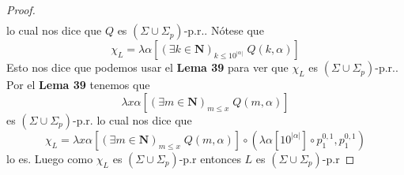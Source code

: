 \begin{lemma}
\begin{proof}
\[\begin{array}{lll}
      \end{array}
    \]
    lo cual nos dice que $Q$ es $(\Sigma \cup \Sigma _{p})$-p.r..
    Nótese que
    \[
      \displaystyle \chi_{L}=\lambda \alpha \left[ (\exists k\in \mathbf{N})_{k\leq 10^{\left\vert \alpha
      \right\vert }}\;Q(k,\alpha )\right]
    \]
    Esto nos dice que podemos usar el \textbf{Lema 39} para ver que $\chi_L$ es $(\Sigma \cup \Sigma _{p})$-p.r..
    Por el \textbf{Lema 39} tenemos que
    \[
      \displaystyle \lambda x\alpha \left[ (\exists m\in \mathbf{N})_{m\leq x}\;Q(m,\alpha ) \right]
    \]
    es $(\Sigma \cup \Sigma _{p})$-p.r. lo cual nos dice que
    \[
      \displaystyle \chi_L=\lambda x\alpha \left[ (\exists m\in \mathbf{N})_{m\leq x}\;Q(m,\alpha ) \right] \circ
      (\lambda \alpha \left[ 10^{\left\vert \alpha \right\vert } \right] \circ p_{1}^{0,1},p_{1}^{0,1})
    \]
    lo es. Luego como $ \chi_L $ es $(\Sigma \cup \Sigma _{p})$-p.r entonces $L$ es $(\Sigma \cup \Sigma _{p})$-p.r


\end{proof}
\end{lemma}
